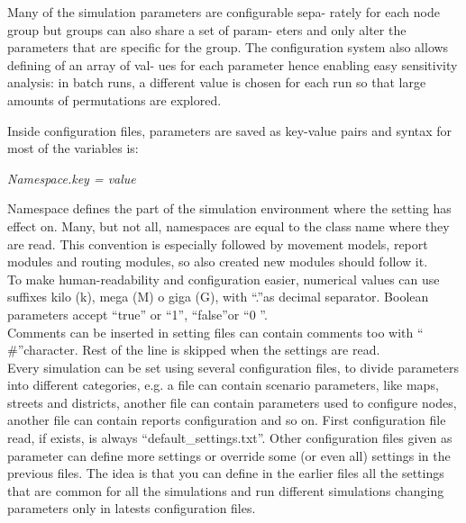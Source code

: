 Many of the simulation parameters are configurable sepa-
rately for each node group but groups can also share a set of param-
eters and only alter the parameters that are specific for the group.
The configuration system also allows defining of an array of val-
ues for each parameter hence enabling easy sensitivity analysis: in
batch runs, a different value is chosen for each run so that large
amounts of permutations are explored.

Inside configuration files, parameters are saved as key-value pairs and syntax for most of the
variables is:

\begin{center}
\textit{Namespace.key = value}
\end{center}

Namespace defines the part of the simulation environment where the setting has effect on. Many, but not all, namespaces are equal to the class name where they are read. This convention is especially followed by movement models, report modules and routing modules, so also created new modules should follow it.
\\

To make human-readability and configuration easier, numerical values can use suffixes kilo (k), mega (M) o giga (G), with \textquotedblleft .\textquotedblright as decimal separator. Boolean parameters accept \textquotedblleft true\textquotedblright
 or \textquotedblleft 1\textquotedblright , \textquotedblleft false\textquotedblright or \textquotedblleft 0 \textquotedblright .
\\
 
Comments can be inserted in setting files can contain comments too with \textquotedblleft
\#\textquotedblright character. Rest of the line is skipped when the settings are read.
\\

Every simulation can be set using several configuration files, to divide parameters into different categories, e.g. a file can contain scenario parameters, like maps, streets and districts, another file can contain parameters used to configure nodes, another file can contain reports configuration and so on. First configuration file read, if exists, is always \textquotedblleft default\_settings.txt\textquotedblright. Other configuration files given as parameter can define more settings or override some (or even all) settings in the previous files. The idea is that you can define in the earlier files all the settings that are common for
all the simulations and run different simulations changing parameters only in latests configuration files.
\\

